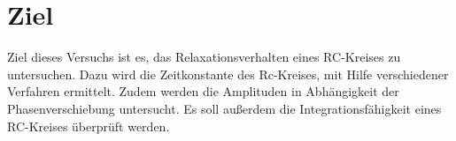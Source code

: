 \section{Ziel}
Ziel dieses Versuchs ist es, das Relaxationsverhalten eines RC-Kreises zu untersuchen.
Dazu wird die Zeitkonstante des Rc-Kreises, mit Hilfe verschiedener Verfahren ermittelt. 
Zudem werden die Amplituden in Abhängigkeit der Phasenverschiebung untersucht. 
Es soll außerdem die Integrationsfähigkeit eines RC-Kreises überprüft werden.